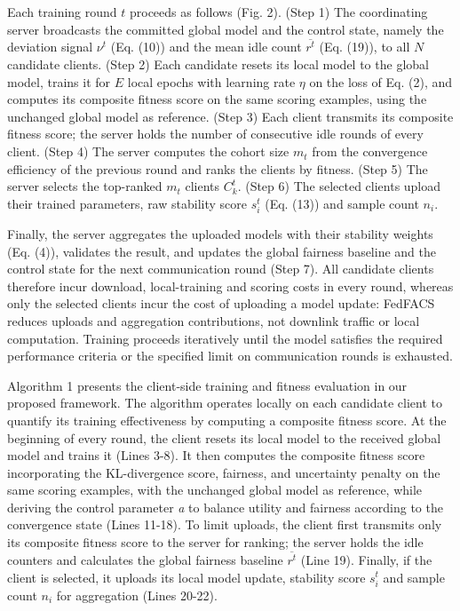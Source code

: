 \documentclass[pdflatex,sn-mathphys-num,oneside]{sn-jnl}%
\theoremstyle{thmstyleone}%
\theoremstyle{thmstyletwo}%
\theoremstyle{thmstylethree}%
\begin{document}
Each training round $t$ proceeds as follows (Fig. 2). (Step 1) The coordinating server broadcasts the committed global model and the control state, namely the deviation signal $\nu^t$ (Eq. (10)) and the mean idle count $\overline{r^t}$ (Eq. (19)), to all $N$ candidate clients. (Step 2) Each candidate resets its local model to the global model, trains it for $E$ local epochs with learning rate $\eta$ on the loss of Eq. (2), and computes its composite fitness score on the same scoring examples, using the unchanged global model as reference. (Step 3) Each client transmits its composite fitness score; the server holds the number of consecutive idle rounds of every client. (Step 4) The server computes the cohort size $m_t$ from the convergence efficiency of the previous round and ranks the clients by fitness. (Step 5) The server selects the top-ranked $m_t$ clients $C_k^t$. (Step 6) The selected clients upload their trained parameters, raw stability score $s_i^t$ (Eq. (13)) and sample count $n_i$.

Finally, the server aggregates the uploaded models with their stability weights (Eq. (4)), validates the result, and updates the global fairness baseline and the control state for the next communication round (Step 7). All candidate clients therefore incur download, local-training and scoring costs in every round, whereas only the selected clients incur the cost of uploading a model update: FedFACS reduces uploads and aggregation contributions, not downlink traffic or local computation. Training proceeds iteratively until the model satisfies the required performance criteria or the specified limit on communication rounds is exhausted.

Algorithm 1 presents the client-side training and fitness evaluation in our proposed framework. The algorithm operates locally on each candidate client to quantify its training effectiveness by computing a composite fitness score. At the beginning of every round, the client resets its local model to the received global model and trains it (Lines 3-8). It then computes the composite fitness score incorporating the KL-divergence score, fairness, and uncertainty penalty on the same scoring examples, with the unchanged global model as reference, while deriving the control parameter \textit{a} to balance utility and fairness according to the convergence state (Lines 11-18). To limit uploads, the client first transmits only its composite fitness score to the server for ranking; the server holds the idle counters and calculates the global fairness baseline $\overline{r^t}$ (Line 19). Finally, if the client is selected, it uploads its local model update, stability score $s_i^t$ and sample count $n_i$ for aggregation (Lines 20-22).
\end{document}
